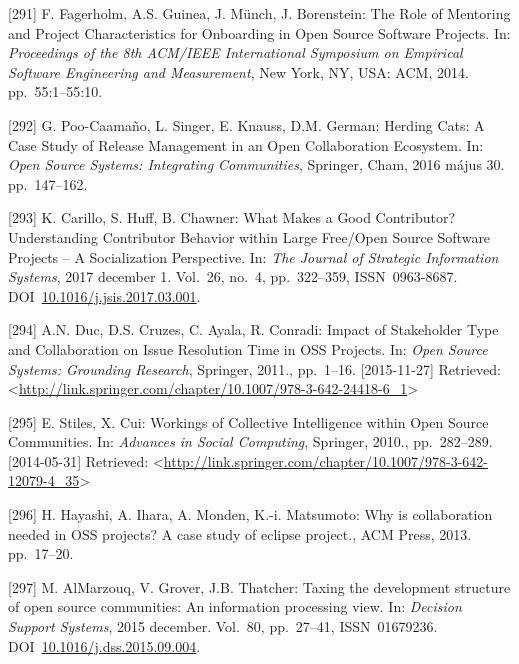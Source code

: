 \documentclass[12pt,magyar,a4paper,oneside]{scrreprt}
\begin{document}
\leavevmode\hypertarget{ref-fagerholm_role_2014}{}%
{[}291{]} F. Fagerholm, A.S. Guinea, J. Münch, J. Borenstein: The Role
of Mentoring and Project Characteristics for Onboarding in Open Source
Software Projects. In: \emph{Proceedings of the 8th ACM/IEEE
International Symposium on Empirical Software Engineering and
Measurement}, New York, NY, USA: ACM, 2014. pp.~55:1--55:10.

\leavevmode\hypertarget{ref-poo-caamano_herding_2016}{}%
{[}292{]} G. Poo-Caamaño, L. Singer, E. Knauss, D.M. German: Herding
Cats: A Case Study of Release Management in an Open Collaboration
Ecosystem. In: \emph{Open Source Systems: Integrating Communities},
Springer, Cham, 2016 május 30. pp.~147--162.

\leavevmode\hypertarget{ref-carillo_what_2017}{}%
{[}293{]} K. Carillo, S. Huff, B. Chawner: What Makes a Good
Contributor? Understanding Contributor Behavior within Large Free/Open
Source Software Projects -- A Socialization Perspective. In: \emph{The
Journal of Strategic Information Systems}, 2017 december 1. Vol.~26,
no.~4, pp.~322--359, ISSN~0963-8687.
DOI~\href{https://doi.org/10.1016/j.jsis.2017.03.001}{10.1016/j.jsis.2017.03.001}.

\leavevmode\hypertarget{ref-duc_impact_2011}{}%
{[}294{]} A.N. Duc, D.S. Cruzes, C. Ayala, R. Conradi: Impact of
Stakeholder Type and Collaboration on Issue Resolution Time in OSS
Projects. In: \emph{Open Source Systems: Grounding Research}, Springer,
2011., pp.~1--16. {[}2015-11-27{]} Retrieved:
\textless{}\url{http://link.springer.com/chapter/10.1007/978-3-642-24418-6_1}\textgreater{}

\leavevmode\hypertarget{ref-stiles_workings_2010}{}%
{[}295{]} E. Stiles, X. Cui: Workings of Collective Intelligence within
Open Source Communities. In: \emph{Advances in Social Computing},
Springer, 2010., pp.~282--289. {[}2014-05-31{]} Retrieved:
\textless{}\url{http://link.springer.com/chapter/10.1007/978-3-642-12079-4_35}\textgreater{}

\leavevmode\hypertarget{ref-hayashi_why_2013}{}%
{[}296{]} H. Hayashi, A. Ihara, A. Monden, K.-i. Matsumoto: Why is
collaboration needed in OSS projects? A case study of eclipse project.,
ACM Press, 2013. pp.~17--20.

\leavevmode\hypertarget{ref-almarzouq_taxing_2015}{}%
{[}297{]} M. AlMarzouq, V. Grover, J.B. Thatcher: Taxing the development
structure of open source communities: An information processing view.
In: \emph{Decision Support Systems}, 2015 december. Vol.~80, pp.~27--41,
ISSN~01679236.
DOI~\href{https://doi.org/10.1016/j.dss.2015.09.004}{10.1016/j.dss.2015.09.004}.
\end{document}
